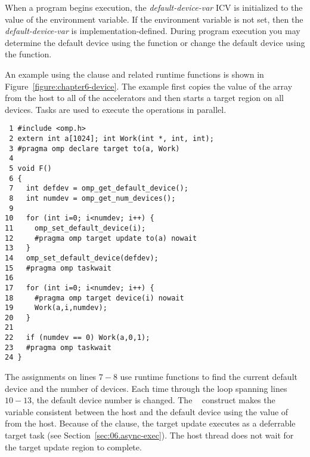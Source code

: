 When a program begins execution, the \emph{default-device-var} ICV is
initialized to the value of the  environment variable.
If the environment variable is not set, then the \emph{default-device-var} is
implementation-defined.  During program execution you may determine the default
device using the  function or change the default
device using the  function.

An example using the  clause and related runtime functions is
shown in Figure~\ref{figure:chapter6-device}. The example first copies the value of the
array  from the host to all of the accelerators and then starts a
target region on all devices.  Tasks are used to
execute the operations in parallel.

\begin{figure*}[!tb]
\begin{verbatim}
 1 #include <omp.h>
 2 extern int a[1024]; int Work(int *, int, int);
 3 #pragma omp declare target to(a, Work)
 4 
 5 void F()
 6 {
 7   int defdev = omp_get_default_device();
 8   int numdev = omp_get_num_devices();
 9 
10   for (int i=0; i<numdev; i++) {
11     omp_set_default_device(i);
12     #pragma omp target update to(a) nowait
13   }
14   omp_set_default_device(defdev);
15   #pragma omp taskwait
16 
17   for (int i=0; i<numdev; i++) {
18     #pragma omp target device(i) nowait
19     Work(a,i,numdev);
20   }
21 
22   if (numdev == 0) Work(a,0,1);
23   #pragma omp taskwait
24 }
\end{verbatim}
\caption{ \textbf {Example of the device clause and related runtime functions} -- \small
          The variable \texttt{a} is updated with the host's value on all devices
          and then the function \texttt{Work()} is executed by all devices.
         }
\label{figure:chapter6-device}
\end{figure*}

The assignments on lines $7-8$ use runtime functions to find the current
default device and the number of devices.  Each time through the loop spanning
lines $10-13$, the default device number is changed. The
~ construct makes the variable  consistent between
the host and the default device using the value of  from the host. Because
of the  clause, the target update executes as a deferrable target
task (see Section~\ref{sec:06.async-exec}).  The host thread does not wait for
the target update region to complete.  


